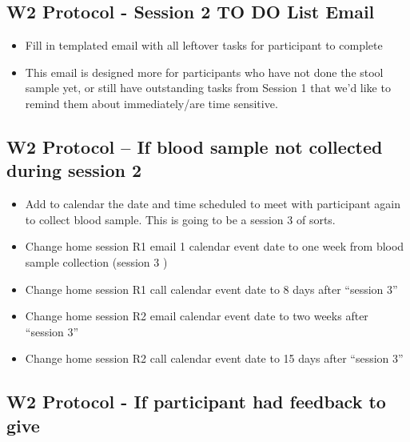 \documentclass[
]{book}
\begin{document}
\hypertarget{w2-protocol---session-2-to-do-list-email}{%
\subsection{W2 Protocol - Session 2 TO DO List Email}\label{w2-protocol---session-2-to-do-list-email}}

\begin{itemize}
\item
  Fill in templated email with all leftover tasks for participant to complete
\item
  This email is designed more for participants who have not done the stool sample yet, or still have outstanding tasks from Session 1 that we'd like to remind them about immediately/are time sensitive.
\end{itemize}

\hypertarget{w2-protocol-if-blood-sample-not-collected-during-session-2}{%
\subsection{W2 Protocol -- If blood sample not collected during session 2}\label{w2-protocol-if-blood-sample-not-collected-during-session-2}}

\begin{itemize}
\item
  Add to calendar the date and time scheduled to meet with participant again to collect blood sample. This is going to be a session 3 of sorts.
\item
  Change home session R1 email 1 calendar event date to one week from blood sample collection (session 3 )\\
\item
  Change home session R1 call calendar event date to 8 days after ``session 3''
\item
  Change home session R2 email calendar event date to two weeks after ``session 3''
\item
  Change home session R2 call calendar event date to 15 days after ``session 3''
\end{itemize}

\hypertarget{w2-protocol---if-participant-had-feedback-to-give}{%
\subsection{W2 Protocol - If participant had feedback to give}\label{w2-protocol---if-participant-had-feedback-to-give}}
\end{document}
